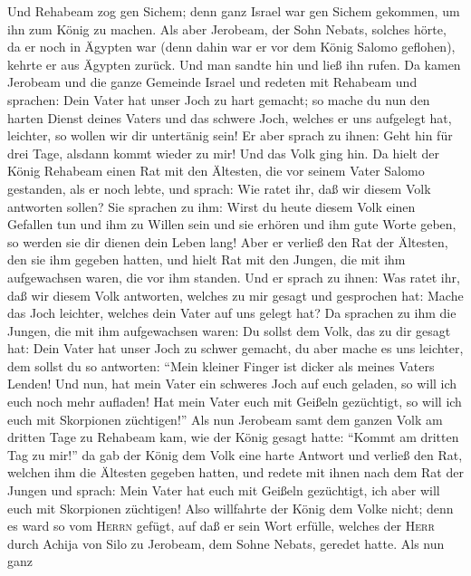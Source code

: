  Und Rehabeam zog gen Sichem; denn ganz Israel war gen
Sichem gekommen, um ihn zum König zu machen.  Als aber
Jerobeam, der Sohn Nebats, solches hörte, da er noch in Ägypten war
(denn dahin war er vor dem König Salomo geflohen), kehrte er aus Ägypten
zurück.  Und man sandte hin und ließ ihn rufen. Da kamen
Jerobeam und die ganze Gemeinde Israel und redeten mit Rehabeam und
sprachen:  Dein Vater hat unser Joch zu hart gemacht; so
mache du nun den harten Dienst deines Vaters und das schwere Joch,
welches er uns aufgelegt hat, leichter, so wollen wir dir untertänig
sein!  Er aber sprach zu ihnen: Geht hin für drei Tage,
alsdann kommt wieder zu mir! Und das Volk ging hin.  Da
hielt der König Rehabeam einen Rat mit den Ältesten, die vor seinem
Vater Salomo gestanden, als er noch lebte, und sprach: Wie ratet ihr,
daß wir diesem Volk antworten sollen?  Sie sprachen zu
ihm: Wirst du heute diesem Volk einen Gefallen tun und ihm zu Willen
sein und sie erhören und ihm gute Worte geben, so werden sie dir dienen
dein Leben lang!  Aber er verließ den Rat der Ältesten,
den sie ihm gegeben hatten, und hielt Rat mit den Jungen, die mit ihm
aufgewachsen waren, die vor ihm standen.  Und er sprach zu
ihnen: Was ratet ihr, daß wir diesem Volk antworten, welches zu mir
gesagt und gesprochen hat: Mache das Joch leichter, welches dein Vater
auf uns gelegt hat?  Da sprachen zu ihm die Jungen, die
mit ihm aufgewachsen waren: Du sollst dem Volk, das zu dir gesagt hat:
Dein Vater hat unser Joch zu schwer gemacht, du aber mache es uns
leichter, dem sollst du so antworten: ``Mein kleiner Finger ist dicker
als meines Vaters Lenden!  Und nun, hat mein Vater ein
schweres Joch auf euch geladen, so will ich euch noch mehr aufladen! Hat
mein Vater euch mit Geißeln gezüchtigt, so will ich euch mit Skorpionen
züchtigen!''  Als nun Jerobeam samt dem ganzen Volk am
dritten Tage zu Rehabeam kam, wie der König gesagt hatte: ``Kommt am
dritten Tag zu mir!''  da gab der König dem Volk eine
harte Antwort und verließ den Rat, welchen ihm die Ältesten gegeben
hatten,  und redete mit ihnen nach dem Rat der Jungen und
sprach: Mein Vater hat euch mit Geißeln gezüchtigt, ich aber will euch
mit Skorpionen züchtigen!  Also willfahrte der König dem
Volke nicht; denn es ward so vom \textsc{Herrn} gefügt, auf daß er sein
Wort erfülle, welches der \textsc{Herr} durch Achija von Silo zu
Jerobeam, dem Sohne Nebats, geredet hatte.  Als nun ganz
